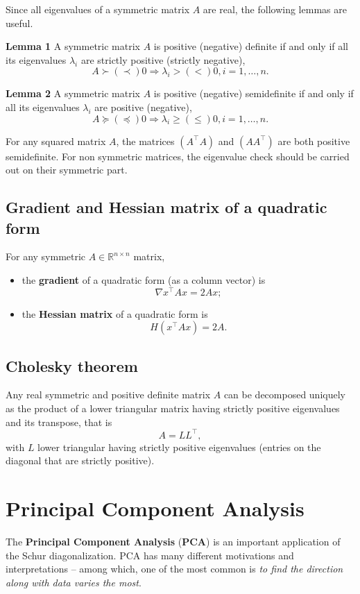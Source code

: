 \documentclass[10pt]{report}
\begin{document}
Since all eigenvalues of a symmetric matrix \(A\) are real, the following lemmas are useful.

\textbf{Lemma 1} A symmetric matrix \(A\) is positive (negative) definite if and only if all its eigenvalues \(\lambda_i\) are strictly positive (strictly negative), $$A \succ (\prec) 0 \Longrightarrow \lambda_i > (<) 0, i=1,\dots,n.$$

\textbf{Lemma 2} A symmetric matrix \(A\) is positive (negative) semidefinite if and only if all its eigenvalues \(\lambda_i\) are positive (negative), $$A \succeq (\preceq) 0 \Longrightarrow \lambda_i \geq (\leq) 0, i=1,\dots,n.$$

For any squared matrix \(A\), the matrices \((A^\top A)\) and \((AA^\top)\) are both positive semidefinite. For non symmetric matrices, the eigenvalue check should be carried out on their symmetric part.
\subsection{Gradient and Hessian matrix of a quadratic form}
\label{sec:orgeae4cfe}
For any symmetric \(A\in\mathbb{R}^{n\times n}\) matrix,
\begin{itemize}
\item the \textbf{gradient} of a quadratic form (as a column vector) is $$\nabla x^\top A x = 2Ax;$$
\item the \textbf{Hessian matrix} of a quadratic form is $$H(x^\top A x) = 2A.$$
\end{itemize}

\subsection{Cholesky theorem}
\label{sec:org770a271}
Any real symmetric and positive definite matrix \(A\) can be decomposed uniquely as the product of a lower triangular matrix having strictly positive eigenvalues and its transpose, that is $$A = LL^\top,$$ with \(L\) lower triangular having strictly positive eigenvalues (entries on the diagonal that are strictly positive).
\section{Principal Component Analysis}
\label{sec:org6d9d72c}
The \textbf{Principal Component Analysis} (\textbf{PCA}) is an important application of the Schur diagonalization. PCA has many different motivations and interpretations -- among which, one of the most common is \emph{to find the direction along with data varies the most}.
\end{document}
